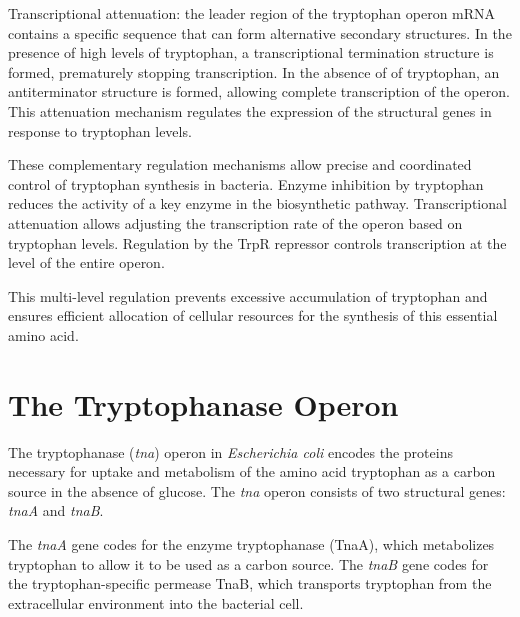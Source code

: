 Transcriptional attenuation: the leader region of the tryptophan operon mRNA contains a specific sequence that can form alternative secondary structures. In the presence of high levels of tryptophan, a transcriptional termination structure is formed, prematurely stopping transcription. In the absence of of tryptophan, an antiterminator structure is formed, allowing complete transcription of the operon. This attenuation mechanism regulates the expression of the structural genes in response to tryptophan levels.

These complementary regulation mechanisms allow precise and coordinated control of tryptophan synthesis in bacteria. Enzyme inhibition by tryptophan reduces the activity of a key enzyme in the biosynthetic pathway. Transcriptional attenuation allows adjusting the transcription rate of the operon based on tryptophan levels. Regulation by the TrpR repressor controls transcription at the level of the entire operon.

This multi-level regulation prevents excessive accumulation of tryptophan and ensures efficient allocation of cellular resources for the synthesis of this essential amino acid.

\section{The Tryptophanase Operon}

The tryptophanase (\textit{tna}) operon in \textit{Escherichia coli} encodes the proteins necessary for uptake and metabolism of the amino acid tryptophan as a carbon source in the absence of glucose. The \textit{tna} operon consists of two structural genes: \textit{tnaA} and \textit{tnaB}.

The \textit{tnaA} gene codes for the enzyme tryptophanase (TnaA), which metabolizes tryptophan to allow it to be used as a carbon source. The \textit{tnaB} gene codes for the tryptophan-specific permease TnaB, which transports tryptophan from the extracellular environment into the bacterial cell.

